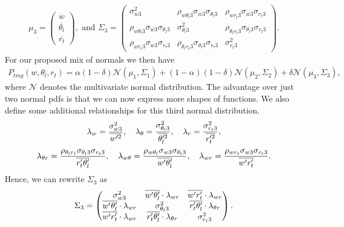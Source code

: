 \begin{align*}
    \mu_3 =
    \begin{pmatrix}
        \overline{w}        \\
        \overline{\theta_l} \\
        \overline{r_t}
    \end{pmatrix},
    \text{ and }
    \Sigma_3 =
    \begin{pmatrix}
        \sigma_{w 3}^2 &
        \rho_{w \theta_l 3} \sigma_{w 3} \sigma_{\theta_l 3} &
        \rho_{w r_t 3} \sigma_{w 3} \sigma_{r_t 3} \\
        \rho_{w \theta_l 3} \sigma_{w 3} \sigma_{\theta_l 3} &
        \sigma_{\theta_l 3}^2 &
        \rho_{\theta_l r_t 3} \sigma_{\theta_l 3} \sigma_{r_t 3} \\
        \rho_{w r_t 3} \sigma_{w 3} \sigma_{r_t 3} &
        \rho_{\theta_l r_t 3} \sigma_{\theta_l 3} \sigma_{r_t 3} &
        \sigma_{r_t 3}^2
    \end{pmatrix}.
\end{align*}
For our proposed mix of normals we then have
\begin{align}
    \label{eq:normal_mix_pdf}
    P_{tmg}(w, \theta_l, r_t)
    = \alpha (1-\delta) \mathcal{N}(\mu_1, \Sigma_1)
    + (1-\alpha) (1-\delta) \mathcal{N}(\mu_2, \Sigma_2)
    + \delta \mathcal{N}(\mu_3, \Sigma_3),
\end{align}
where $\mathcal{N}$ denotes the multivariate normal distribution.
The advantage over just two normal \glspl{pdf} is that we can now express more shapes of functions.
We also define some additional relationships for this third normal distribution.
\begin{align}
    \label{eq:lambda}
    \lambda_w = \frac{\sigma_{w 3}^2}{\overline{w'^2}}, \quad
    \lambda_\theta = \frac{\sigma_{\theta_l 3}^2}{\overline{\theta_l'^2}}, \quad
    \lambda_r = \frac{\sigma_{r_t 3}^2}{\overline{r_t'^2}},
\end{align}
\begin{align}
    \label{eq:lambda_two}
    \lambda_{\theta r} = \frac{\rho_{\theta_l r_t} \sigma_{\theta_l 3} \sigma_{r_t 3}}{\overline{r_t' \theta_l'}}, \quad
    \lambda_{w \theta} = \frac{\rho_{w \theta_l} \sigma_{w 3} \sigma_{\theta_l 3}}{\overline{w' \theta_l'}}, \quad
    \lambda_{w r} = \frac{\rho_{w r_t} \sigma_{w 3} \sigma_{r_t 3}}{\overline{w' r_t'}}.
\end{align}
Hence, we can rewrite $\Sigma_3$ as
\begin{align}
    \Sigma_3 =
    \begin{pmatrix}
        \sigma_{w 3}^2 &
        \overline{w' \theta_l'} \cdot \lambda_{w r} &
        \overline{w' r_t'} \cdot \lambda_{w r} \\
        \overline{w' \theta_l'} \cdot \lambda_{w r} &
        \sigma_{\theta_l 3}^2 &
        \overline{r_t' \theta_l'} \cdot \lambda_{\theta r} \\
        \overline{w' r_t'} \cdot \lambda_{w r} &
        \overline{r_t' \theta_l'} \cdot \lambda_{\theta r} &
        \sigma_{r_t 3}^2
    \end{pmatrix}.
\end{align}